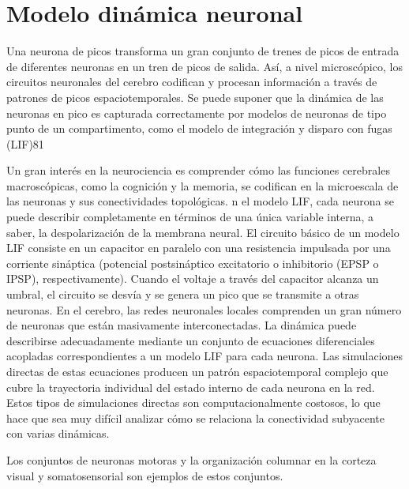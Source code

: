 \chapter{Modelo dinámica neuronal}\label{cap:modeloneuronal}
\graphicspath{{figs/capitulo_modelo_dinamica_neuronal/}}





Una neurona de picos transforma un gran conjunto de trenes de picos de entrada de diferentes neuronas en un tren de picos de salida. Así, a nivel microscópico, los circuitos neuronales del cerebro codifican y procesan información a través de patrones de picos espaciotemporales. Se puede suponer que la dinámica de las neuronas en pico es capturada correctamente por modelos de neuronas de tipo punto de un compartimento, como el modelo de integración y disparo con fugas (LIF)81

Un gran interés en la neurociencia es comprender cómo las funciones cerebrales macroscópicas, como la cognición y la memoria, se codifican en la microescala de las neuronas y sus conectividades topológicas. n el modelo LIF, cada neurona se puede describir completamente en términos de una única variable interna, a saber, la despolarización de la membrana neural. El circuito básico de un modelo LIF consiste en un capacitor en paralelo con una resistencia impulsada por una corriente sináptica (potencial postsináptico excitatorio o inhibitorio (EPSP o IPSP), respectivamente). Cuando el voltaje a través del capacitor alcanza un umbral, el circuito se desvía y se genera un pico que se transmite a otras neuronas. En el cerebro, las redes neuronales locales comprenden un gran número de neuronas que están masivamente interconectadas. La dinámica puede describirse adecuadamente mediante un conjunto de ecuaciones diferenciales acopladas correspondientes a un modelo LIF para cada neurona. Las simulaciones directas de estas ecuaciones producen un patrón espaciotemporal complejo que cubre la trayectoria individual del estado interno de cada neurona en la red. Estos tipos de simulaciones directas son computacionalmente costosos, lo que hace que sea muy difícil analizar cómo se relaciona la conectividad subyacente con varias dinámicas.  

Los conjuntos de neuronas motoras y la organización columnar en la corteza visual y somatosensorial son ejemplos de estos conjuntos. 



